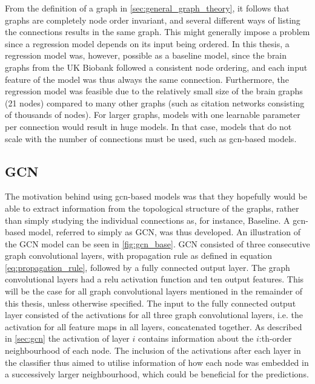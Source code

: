 From the definition of a graph in \cref{sec:general_graph_theory}, it follows that graphs are completely node order invariant, and several different ways of listing the connections results in the same graph. This might generally impose a problem since a regression model depends on its input being ordered. In this thesis, a regression model was, however, possible as a baseline model, since the brain graphs from the UK Biobank followed a consistent node ordering, and each input feature of the model was thus always the same connection. Furthermore, the regression model was feasible due to the relatively small size of the brain graphs (21 nodes) compared to many other graphs (such as citation networks consisting of thousands of nodes). For larger graphs, models with one learnable parameter per connection would result in huge models. In that case, models that do not scale with the number of connections must be used, such as \acrshort{gcn}-based models. 

%         

\subsection{GCN}

The motivation behind using \acrshort{gcn}-based models was that they hopefully would be able to extract information from the topological structure of the graphs, rather than simply studying the individual connections as, for instance, Baseline. A \acrshort{gcn}-based model, referred to simply as GCN, was thus developed. An illustration of the GCN model can be seen in \cref{fig:gcn_base}. GCN consisted of three consecutive graph convolutional layers, with propagation rule as defined in equation \eqref{eq:propagation_rule}, followed by a fully connected output layer. The graph convolutional layers had a \acrfull{relu} activation function and ten output features. This will be the case for all graph convolutional layers mentioned in the remainder of this thesis, unless otherwise specified. The input to the fully connected output layer consisted of the activations for all three graph convolutional layers, i.e. the activation for all feature maps in all layers, concatenated together. As described in \cref{sec:gcn} the activation of layer $i$ contains information about the $i$:th-order neighbourhood of each node. The inclusion of the activations after each layer in the classifier thus aimed to utilise information of how each node was embedded in a successively larger neighbourhood, which could be beneficial for the predictions.

